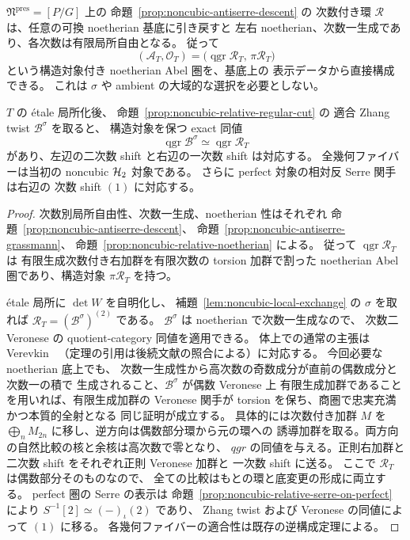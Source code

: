 \begin{proposition}
\label{prop:noncubic-relative-heart-veronese}
$\mathfrak N^{\mathrm{pres}}=[P/G]$ 上の
命題~\ref{prop:noncubic-antiserre-descent} の
次数付き環 $\mathcal R$ は、任意の可換 noetherian 基底に引き戻すと
左右 noetherian、次数一生成であり、各次数は有限局所自由となる。
従って
\[
  (\mathcal A_T,\mathcal O_T)
  =\bigl(\operatorname{qgr}\mathcal R_T,\,
          \pi\mathcal R_T\bigr)
  \tag{NC-heart}\label{eq:noncubic-relative-heart}
\]
という構造対象付き noetherian Abel 圏を、基底上の
表示データから直接構成できる。
これは $\sigma$ や ambient の大域的な選択を必要としない。

$T$ の \'etale 局所化後、
命題~\ref{prop:noncubic-relative-regular-cut} の
適合 Zhang twist $\mathcal B^\sigma$ を取ると、
構造対象を保つ exact 同値
\[
 \operatorname{qgr}\mathcal B^\sigma
       \simeq\operatorname{qgr}\mathcal R_T
\]
があり、左辺の二次数 shift と右辺の一次数 shift は対応する。
全幾何ファイバーは当初の noncubic $\mathcal H_2$ 対象である。
さらに perfect 対象の相対反 Serre 関手は右辺の
次数 shift $(1)$ に対応する。
\end{proposition}
\begin{proof}
次数別局所自由性、次数一生成、noetherian 性はそれぞれ
命題~\ref{prop:noncubic-antiserre-descent}、
命題~\ref{prop:noncubic-antiserre-grassmann}、
命題~\ref{prop:noncubic-relative-noetherian} による。
従って $\operatorname{qgr}\mathcal R_T$ は
有限生成次数付き右加群を有限次数の torsion 加群で割った
noetherian Abel 圏であり、構造対象 $\pi\mathcal R_T$ を持つ。

\'etale 局所に $\det W$ を自明化し、
補題~\ref{lem:noncubic-local-exchange} の $\sigma$ を取れば
$\mathcal R_T=(\mathcal B^\sigma)^{(2)}$ である。
$\mathcal B^\sigma$ は noetherian で次数一生成なので、
次数二 Veronese の quotient-category 同値を適用できる。
体上での通常の主張は Verevkin~\cite[Theorem 4.4]{Verevkin1992}
（定理の引用は後続文献の照合による）に対応する。
今回必要な noetherian 底上でも、
次数一生成性から高次数の奇数成分が直前の偶数成分と次数一の積で
生成されること、$\mathcal B^\sigma$ が偶数 Veronese 上
有限生成加群であることを用いれば、有限生成加群の
Veronese 関手が torsion を保ち、商圏で忠実充満かつ本質的全射となる
同じ証明が成立する。
具体的には次数付き加群 $M$ を
$\bigoplus_{n}M_{2n}$ に移し、逆方向は偶数部分環から元の環への
誘導加群を取る。両方向の自然比較の核と余核は高次数で零となり、
$qgr$ の同値を与える。正則右加群と
二次数 shift をそれぞれ正則 Veronese 加群と
一次数 shift に送る。
ここで $\mathcal R_T$ は偶数部分そのものなので、
全ての比較はもとの環と底変更の形成に両立する。
perfect 圏の Serre の表示は
命題~\ref{prop:noncubic-relative-serre-on-perfect} により
$S^{-1}[2]\simeq(-)_\iota(2)$ であり、
Zhang twist および Veronese の同値によって $(1)$ に移る。
各幾何ファイバーの適合性は既存の逆構成定理による。
\end{proof}

